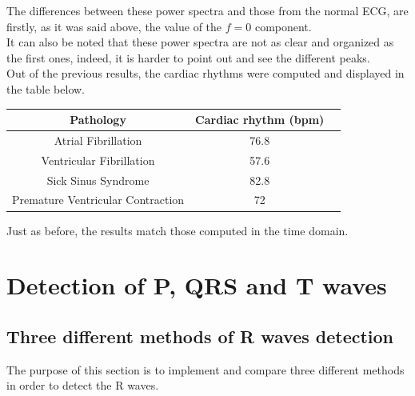 \documentclass[11pt]{article}
\begin{document}
		The differences between these power spectra and those from the normal ECG, are firstly, as it was said above, the value of the $f=0$ component.\\
		It can also be noted that these power spectra are not as clear and organized as the first ones, indeed, it is harder to point out and see the different peaks.
		\\
		Out of the previous results, the cardiac rhythms were computed and displayed in the table below. 
		\begin{center}
			\begin{tabular}{|c|c|c|}
				\hline
				\textbf{Pathology} & \textbf{Cardiac rhythm (bpm)} \\
				\hline
				Atrial Fibrillation & 76.8 \\ 
				\hline
				Ventricular Fibrillation & 57.6 \\
				\hline
				Sick Sinus Syndrome & 82.8 \\
				\hline
				Premature Ventricular Contraction & 72 \\
				\hline
			\end{tabular}
		\end{center}
		\vspace{0.3in}
		Just as before, the results match those computed in the time domain.



\section{Detection of P, QRS and T waves}
	\subsection{Three different methods of R waves detection}
		The purpose of this section is to implement and compare three different methods in order to detect the R waves.
\end{document}
